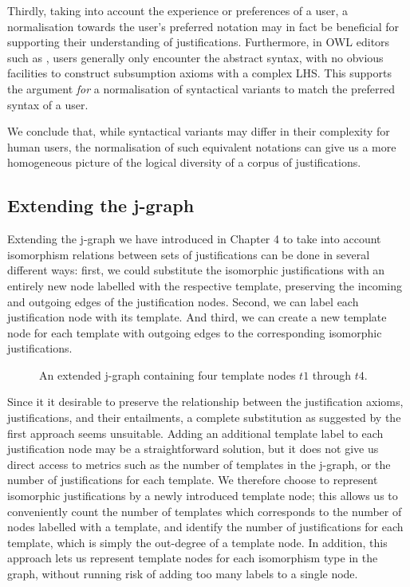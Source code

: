 Thirdly, taking into account the experience or preferences of a user, a normalisation towards the user's preferred notation may in fact be beneficial for supporting their understanding of justifications. Furthermore, in OWL editors such as \protege, users generally only encounter the abstract syntax, with no obvious facilities to construct subsumption axioms with a complex LHS. This supports the argument \emph{for} a normalisation of syntactical variants to match the preferred syntax of a user.

We conclude that, while syntactical variants may differ in their complexity for human users, the normalisation of such equivalent notations can give us a more homogeneous picture of the logical diversity of a corpus of justifications.


\subsection{Extending the j-graph}

Extending the j-graph we have introduced in Chapter 4 to take into account isomorphism relations between sets of justifications can be done in several different ways: first, we could  substitute the isomorphic justifications with an entirely new node labelled with the respective template, preserving the incoming and outgoing edges of the justification nodes. Second, we can label each justification node with its template. And third, we can create a new template node for each template with outgoing edges to the corresponding isomorphic justifications. 

\begin{figure}[htb]
\centering
{}
\caption[An extended j-graph containing four template nodes.]{An extended j-graph containing four template nodes $t1$ through $t4$.}\label{fig:jgraph-iso}
\end{figure}

Since it it desirable to preserve the relationship between the justification axioms, justifications, and their entailments, a complete substitution as suggested by the first approach seems unsuitable. Adding an additional template label to each justification node may be a straightforward solution, but it does not give us direct access to metrics such as the number of templates in the j-graph, or the number of justifications for each template. We therefore choose to represent isomorphic justifications by a newly introduced template node; this allows us to conveniently count the number of templates which corresponds to the number of nodes labelled with a template, and identify the number of justifications for each template, which is simply the out-degree of a template node. In addition, this approach lets us represent template nodes for each isomorphism type in the graph, without running risk of adding too many labels to a single node. 

